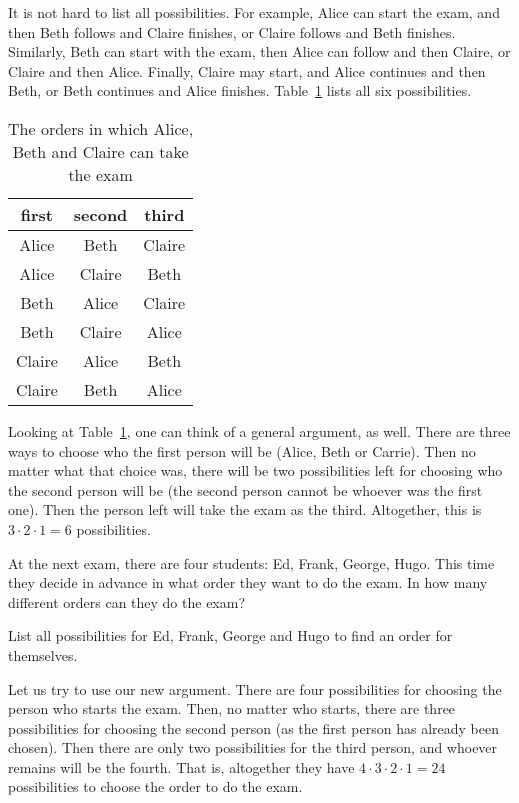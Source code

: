 It is not hard to list all possibilities. 
For example, Alice can start the exam, 
and then Beth follows and Claire finishes, 
or Claire follows and Beth finishes. 
Similarly, Beth can start with the exam, 
then Alice can follow and then Claire, 
or Claire and then Alice. 
Finally, 
Claire may start, and Alice continues and then Beth, 
or Beth continues and Alice finishes. 
Table~\ref{tab:perm1} lists all six possibilities. 

\begin{table}[!htb]
\caption{The orders in which Alice, Beth and Claire can take the exam}\label{tab:perm1}
\begin{center}
\begin{tabular}{c|c|c}
first & second & third \\
\hline
Alice & Beth & Claire \\
Alice & Claire & Beth \\
Beth & Alice & Claire \\
Beth & Claire & Alice \\
Claire & Alice & Beth \\
Claire & Beth & Alice
\end{tabular}
\end{center}
\end{table}

Looking at Table~\ref{tab:perm1}, 
one can think of a general argument, as well. 
There are three ways to choose who the first person will be (Alice, Beth or Carrie). 
Then no matter what that choice was, 
there will be two possibilities left for choosing who the second person will be 
(the second person cannot be whoever was the first one). 
Then the person left will take the exam as the third. 
Altogether, this is $3 \cdot 2 \cdot 1 = 6$ possibilities. 

At the next exam, 
there are four students: 
Ed, Frank, George, Hugo. 
This time they decide in advance in what order they want to do the exam. 
In how many different orders can they do the exam? 

\begin{exercise}\label{ex:ExamEFGH}
List all possibilities for Ed, Frank, George and Hugo to find an order for themselves. 
\end{exercise}

Let us try to use our new argument. 
There are four possibilities for choosing the person who starts the exam. 
Then, no matter who starts, there are three possibilities for choosing the second person
(as the first person has already been chosen). 
Then there are only two possibilities for the third person, 
and whoever remains will be the fourth. 
That is, 
altogether they have $4 \cdot 3 \cdot 2 \cdot 1 = 24$ possibilities to choose the order to do the exam. 


